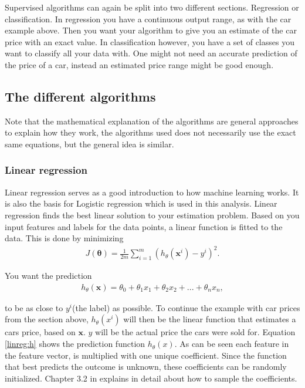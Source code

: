         Supervised algorithms can again be split into two different sections. Regression or classification. In regression you have a continuous output range, as with the car example above. Then you want your algorithm to give you an estimate of the car price with an exact value. In classification however, you have a set of classes you want to classify all your data with. One might not need an accurate prediction of the price of a car, instead an estimated price range might be good enough.
        
    
    \subsection{The different algorithms}
        
            
            Note that the mathematical explanation of the algorithms are general approaches to explain how they work, the algorithms used does not necessarily use the exact same equations, but the general idea is similar. 
        
        \subsubsection{Linear regression}
            Linear regression serves as a good introduction to how machine learning works. It is also the basis for Logistic regression which is used in this analysis. Linear regression finds the best linear solution to your estimation problem. Based on you input features and labels for the data points, a linear function is fitted to the data. This is done by minimizing 
            \begin{align}
                J(\bm\theta) = \frac{1}{2m} \sum_{i=1}^{m}(h_\theta(\bm x^i) - y^i)^2.
                \label{linreg:cost}
            \end{align}
            
            You want the prediction 
            \begin{align}
                h_{\theta}(\bm x) = \theta_0 + \theta_{1}x_1 + \theta_{2}x_2 + ...+ \theta_{n}x_n,
                \label{linreg:h}
            \end{align}
            
            to be as close to $y^i$(the label) as possible. To continue the example with car prices from the section above, $h_\theta(x^i)$ will then be the linear function that estimates a cars price, based on $\bm x$. $y$ will be the actual price the cars were sold for. Equation \ref{linreg:h} shows the prediction function $h_\theta(x)$. As can be seen each feature in the feature vector, is multiplied with one unique coefficient. Since the function that best predicts the outcome is unknown, these coefficients can be randomly initialized. Chapter 3.2 in \cite{Hastie} explains in detail about how to sample the coefficients.  
            
